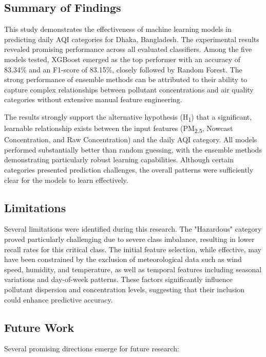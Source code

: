 \documentclass[a4paper,fleqn]{cas-dc}
\begin{document}
\subsection{Summary of Findings}

This study demonstrates the effectiveness of machine learning models in predicting daily AQI categories for Dhaka, Bangladesh. The experimental results revealed promising performance across all evaluated classifiers. Among the five models tested, XGBoost emerged as the top performer with an accuracy of 83.34\% and an F1-score of 83.15\%, closely followed by Random Forest. The strong performance of ensemble methods can be attributed to their ability to capture complex relationships between pollutant concentrations and air quality categories without extensive manual feature engineering.

The results strongly support the alternative hypothesis (H\textsubscript{1}) that a significant, learnable relationship exists between the input features (PM\textsubscript{2.5}, Nowcast Concentration, and Raw Concentration) and the daily AQI category. All models performed substantially better than random guessing, with the ensemble methods demonstrating particularly robust learning capabilities. Although certain categories presented prediction challenges, the overall patterns were sufficiently clear for the models to learn effectively.

\subsection{Limitations}

Several limitations were identified during this research. The "Hazardous" category proved particularly challenging due to severe class imbalance, resulting in lower recall rates for this critical class. The initial feature selection, while effective, may have been constrained by the exclusion of meteorological data such as wind speed, humidity, and temperature, as well as temporal features including seasonal variations and day-of-week patterns. These factors significantly influence pollutant dispersion and concentration levels, suggesting that their inclusion could enhance predictive accuracy.

\subsection{Future Work}

Several promising directions emerge for future research:
\end{document}
